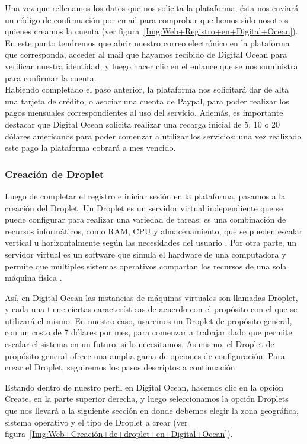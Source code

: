 \newpage

Una vez que rellenamos los datos que nos solicita la plataforma, ésta nos enviará un código de confirmación por email para comprobar que hemos sido nosotros quienes creamos la cuenta (ver figura~\ref{Img:Web+Registro+en+Digital+Ocean}). En este punto tendremos que abrir nuestro correo electrónico en la plataforma que corresponda, acceder al mail que hayamos recibido de Digital Ocean para verificar nuestra identidad, y luego hacer clic en el enlance que se nos suministra para confirmar la cuenta.\\
Habiendo completado el paso anterior, la plataforma nos solicitará dar de alta una tarjeta de crédito, o asociar una cuenta de Paypal, para poder realizar los pagos mensuales correspondientes al uso del servicio. Además, es importante destacar que Digital Ocean solicita realizar una recarga inicial de 5, 10 o 20 dólares americanos para poder comenzar a utilizar los servicios; una vez realizado este pago la plataforma cobrará a mes vencido.

\subsubsection{Creación de Droplet}

Luego de completar el registro e iniciar sesión en la plataforma, pasamos a la creación del Droplet. Un Droplet es un servidor virtual independiente que se puede configurar para realizar una variedad de tareas; es una combinación de recursos informáticos, como RAM, CPU y almacenamiento, que se pueden escalar vertical u horizontalmente según las necesidades del usuario \cite{web:digitalocean}. Por otra parte, un servidor virtual es un software que simula el hardware de una computadora y permite que múltiples sistemas operativos compartan los recursos de una sola máquina física \cite{web:vps}.

Así, en Digital Ocean las instancias de máquinas virtuales son llamadas Droplet, y cada una tiene ciertas características de acuerdo con el propósito con el que se utilizará el mismo. En nuestro caso, usaremos un Droplet de propósito general, con un costo de 7 dólares por mes, para comenzar a trabajar dado que permite escalar el sistema en un futuro, si lo necesitamos. Asimismo, el Droplet de propósito general ofrece una amplia gama de opciones de configuración. Para crear el Droplet, seguiremos los pasos descriptos a continuación. 

Estando dentro de nuestro perfil en Digital Ocean, hacemos clic en la opción Create, en la parte superior derecha, y luego seleccionamos la opción Droplets que nos llevará a la siguiente sección en donde debemos elegir la zona geográfica, sistema operativo y el tipo de Droplet a crear (ver figura~\ref{Img:Web+Creación+de+droplet+en+Digital+Ocean}). 

